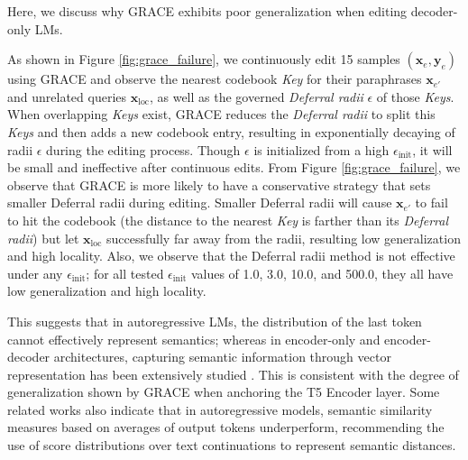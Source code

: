 \documentclass{article}
\begin{document}
Here, we discuss why GRACE exhibits poor generalization when editing decoder-only LMs.

As shown in Figure \ref{fig:grace_failure}, we continuously edit 15 samples $(\mathbf{x}_e, \mathbf{y}_e)$ using GRACE and observe the nearest codebook \textit{Key} for their paraphrases $\mathbf{x}_{e'}$ and unrelated queries $\mathbf{x}_{\text{loc}}$, as well as the governed \textit{Deferral radii} $\epsilon$ of those \textit{Keys}.
When overlapping \textit{Keys} exist, GRACE reduces the \textit{Deferral radii} to split this \textit{Keys} and then adds a new codebook entry, resulting in exponentially decaying of radii $\epsilon$ during the editing process. Though $\epsilon$ is initialized from a high $\epsilon_{\text{init}}$, it will be small and ineffective after continuous edits. 
From Figure \ref{fig:grace_failure}, we observe that GRACE is more likely to have a conservative strategy that sets smaller Deferral radii during editing. Smaller Deferral radii will cause $\mathbf{x}_{e'}$ to fail to hit the codebook (the distance to the nearest \textit{Key} is farther than its \textit{Deferral radii}) but let $\mathbf{x}_{\text{loc}}$ successfully far away from the radii, resulting low generalization and high locality. Also, we observe that the Deferral radii method is not effective under any $\epsilon_{\text{init}}$; for all tested $\epsilon_{\text{init}}$ values of 1.0, 3.0, 10.0, and 500.0, they all have low generalization and high locality. 

This suggests that in autoregressive LMs, the distribution of the last token cannot effectively represent semantics; whereas in encoder-only and encoder-decoder architectures, capturing semantic information through vector representation has been extensively studied \cite{bert, sentencebert, simcse}. This is consistent with the degree of generalization shown by GRACE when anchoring the T5 \cite{T5} Encoder layer. 
Some related works \cite{meaning_trajectory} also indicate that in autoregressive models, semantic similarity measures based on averages of output tokens underperform, recommending the use of score distributions over text continuations to represent semantic distances.
\end{document}
